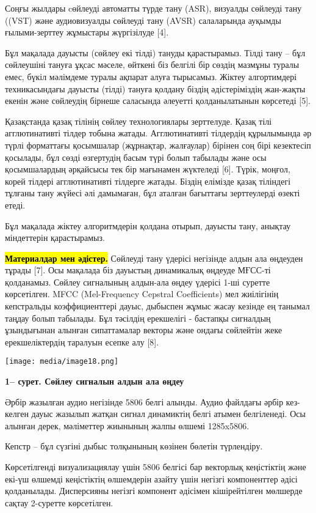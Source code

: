 \documentclass[
]{article}
\begin{document}
Соңғы жылдары cөйлеуді автоматты түрде тану (ASR), визуалды сөйлеуді
тану ((VST) және аудиовизуалды сөйлеуді тану (AVSR) салаларында ауқымды
ғылыми-зерттеу жұмыстары жүргізілуде {[}4{]}.

Бұл мақалада дауысты (сөйлеу екі тілді) тануды қарастырамыз. Тілді тану
-- бұл сөйлеушіні тануға ұқсас мәселе, өйткені біз белгілі бір сөздің
мазмұны туралы емес, бүкіл мәлімдеме туралы ақпарат алуға тырысамыз.
Жіктеу алгортимдері техникасындағы дауысты (тілді) тануға қолдану біздің
әдістеріміздің жан-жақты екенін және сөйлеудің бірнеше саласында
әлеуетті қолданылатынын көрсетеді {[}5{]}.

Қазақстанда қазақ тілінің сөйлеу технологиялары зерттелуде. Қазақ тілі
агглютинативті тілдер тобына жатады. Агглютинативті тілдердің
құрылымында әр түрлі форматтағы қосымшалар (жұрнақтар, жалғаулар)
бірінен соң бірі кезектесіп қосылады, бұл сөзді өзгертудің басым түрі
болып табылады және осы қосымшалардың әрқайсысы тек бір мағынамен
жүктеледі {[}6{]}. Түрік, моңғол, корей тілдері агглютинативті тілдерге
жатады. Біздің елімізде қазақ тіліндегі тұлғаны тану жүйесі әлі
дамымаған, бұл аталған бағыттағы зерттеулерді өзекті етеді.

Бұл мақалада жіктеу алгоритмдерін қолдана отырып, дауысты тану, анықтау
міндеттерін қарастырамыз.

\textbf{\hl{Материалдар мен әдістер.}} Сөйлеуді тану үдерісі негізінде
алдын ала өңдеуден тұрады {[}7{]}. Осы мақалада біз дауыстың динамикалық
өңдеуде МҒСС-ті қолданамыз. Сөйлеу сигналының алдын-ала өңдеу үдерісі
1-ші суретте көрсетілген. MFCC (Mel-Frequency Cepstral Coefficients) мел
жиілігінің кепстральды коэффициенттері дауыс, дыбыспен жұмыс жасау
кезінде ең танымал таңдау болып табылады. Бұл тәсілдің ерекшелігі -
бастапқы сигналдың ұзындығынан алынған сипаттамалар векторы және ондағы
сөйлейтін жеке ерекшеліктердің таралуын есепке алу {[}8{]}.

\texttt{[image: media/image18.png]}

\textbf{1-- сурет. Сөйлеу сигналын алдын ала өңдеу}

Әрбір жазылған аудио негізінде 5806 белгі алынды. Аудио файлдағы әрбір
кез-келген дауыс жазылып жатқан сигнал динамиктің белгі атымен
белгіленеді. Осы алынған дерек, мәліметтер жиынының жалпы өлшемі
1285x5806.

Кепстр -- бұл сүзгіні дыбыс толқынының көзінен бөлетін түрлендіру.

Көрсетілгенді визуализациялау үшін 5806 белгісі бар векторлық
кеңістіктің және екі-үш өлшемді кеңістіктің өлшемдерін азайту үшін
негізгі компоненттер әдісі қолданылады. Дисперсияны негізгі компонент
әдісімен кішірейтілген мөлшерде сақтау 2-суретте көрсетілген.
\end{document}
